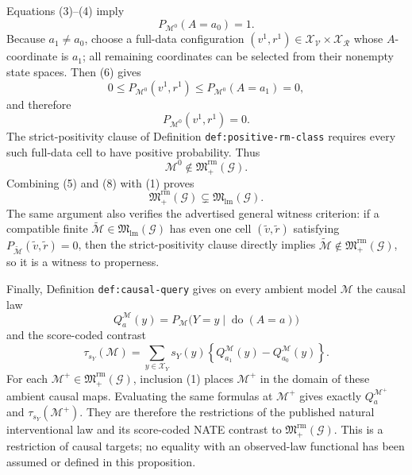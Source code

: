 Equations (3)--(4) imply
\[
P_{\mathcal M^{0}}(A=a_0)=1.
\tag{6}
\]
Because \(a_1\ne a_0\), choose a full-data configuration \((v^{1},r^{1})\in\mathcal X_{\mathcal V}\times\mathcal X_{\mathcal R}\) whose \(A\)-coordinate is \(a_1\); all remaining coordinates can be selected from their nonempty state spaces.  Then (6) gives
\[
0\le P_{\mathcal M^{0}}(v^{1},r^{1})
\le P_{\mathcal M^{0}}(A=a_1)=0,
\]
and therefore
\[
P_{\mathcal M^{0}}(v^{1},r^{1})=0.
\tag{7}
\]
The strict-positivity clause of Definition \texttt{def:positive-rm-class} requires every such full-data cell to have positive probability.  Thus
\[
\mathcal M^{0}\notin\mathfrak M_{+}^{\mathrm{rm}}(\mathcal G).
\tag{8}
\]
Combining (5) and (8) with (1) proves
\[
\mathfrak M_{+}^{\mathrm{rm}}(\mathcal G)
\subsetneq
\mathfrak M_{\mathrm{lm}}(\mathcal G).
\]
The same argument also verifies the advertised general witness criterion: if a compatible finite \(\widetilde{\mathcal M}\in\mathfrak M_{\mathrm{lm}}(\mathcal G)\) has even one cell \((\widetilde v,\widetilde r)\) satisfying \(P_{\widetilde{\mathcal M}}(\widetilde v,\widetilde r)=0\), then the strict-positivity clause directly implies \(\widetilde{\mathcal M}\notin\mathfrak M_{+}^{\mathrm{rm}}(\mathcal G)\), so it is a witness to properness.

Finally, Definition \texttt{def:causal-query} gives on every ambient model \(\mathcal M\) the causal law
\[
Q_a^{\mathcal M}(y)
=P_{\mathcal M}\bigl(Y=y\mid\operatorname{do}(A=a)\bigr)
\]
and the score-coded contrast
\[
\tau_{s_Y}(\mathcal M)
=\sum_{y\in\mathcal X_Y}s_Y(y)
\left\{Q_{a_1}^{\mathcal M}(y)-Q_{a_0}^{\mathcal M}(y)\right\}.
\tag{9}
\]
For each \(\mathcal M^{+}\in\mathfrak M_{+}^{\mathrm{rm}}(\mathcal G)\), inclusion (1) places \(\mathcal M^{+}\) in the domain of these ambient causal maps.  Evaluating the same formulas at \(\mathcal M^{+}\) gives exactly \(Q_a^{\mathcal M^{+}}\) and \(\tau_{s_Y}(\mathcal M^{+})\).  They are therefore the restrictions of the published natural interventional law and its score-coded NATE contrast to \(\mathfrak M_{+}^{\mathrm{rm}}(\mathcal G)\).  This is a restriction of causal targets; no equality with an observed-law functional has been assumed or defined in this proposition.